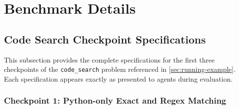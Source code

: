 \section{Benchmark Details}\label{sec:appendix-benchmark}

\subsection{Code Search Checkpoint Specifications}\label{sec:appendix-code-search}

This subsection provides the complete specifications for the first three checkpoints of the \texttt{code\_search} problem referenced in \autoref{sec:running-example}. Each specification appears exactly as presented to agents during evaluation.

\subsubsection{Checkpoint 1: Python-only Exact and Regex Matching}
\label{sec:appendix-cp1}

